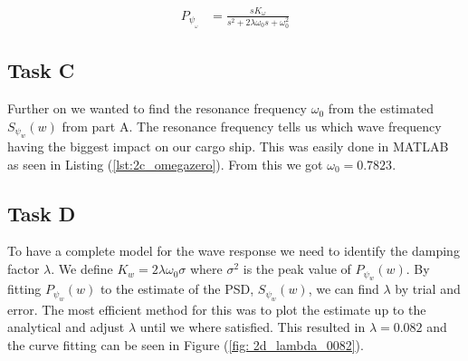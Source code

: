 \begin{equation}
    \begin{align}
        P_\psi__\omega &= \frac{sK_\omega}{s^2 + 2\lambda\omega_0s + \omega_0^2}
    \end{align}
\end{equation}

\subsection{Task C}
Further on we wanted to find the resonance frequency $\omega_0$ from the estimated $S_{\psi_w}(w)$ from part A. The resonance frequency tells us which wave frequency having the biggest impact on our cargo ship. This was easily done in MATLAB as seen in Listing (\ref{lst:2c_omegazero}). From this we got $\omega_0 = 0.7823$. 


\subsection{Task D}

To have a complete model for the wave response we need to identify the damping factor $\lambda$. We define $K_w = 2\lambda\omega_0\sigma$ where $\sigma^2$ is the peak value of $P_{\psi_w}(w)$. By fitting $P_{\psi_w}(w)$ to the estimate of the PSD, $S_{\psi_w}(w)$, we can find $\lambda$ by trial and error. The most efficient method for this was to plot the estimate up to the analytical and adjust $\lambda$ until we where satisfied. This resulted in $\lambda = 0.082$ and the curve fitting can be seen in Figure (\ref{fig: 2d_lambda_0082}). 